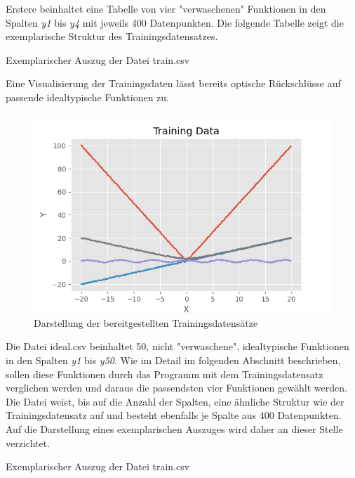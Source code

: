 Erstere beinhaltet eine Tabelle von vier "verwaschenen" Funktionen in den Spalten \emph{y1} bis \emph{y4} mit jeweils 400 Datenpunkten. Die folgende Tabelle zeigt die exemplarische Struktur des Trainingsdatensatzes.

\begin{table}[H]
\small
\centering
{}
\caption{Exemplarischer Auszug der Datei train.csv}
\label{tab:train.csv}
\end{table} 


Eine Visualisierung der Trainingsdaten lässt bereits optische Rückschlüsse auf passende idealtypische Funktionen zu.
\begin{figure}[h]
\centering
\includegraphics[width=13cm]{../output/figures/train.png}
\caption{Darstellung der bereitgestellten Trainingsdatensätze \cite{Gage:18}}\label{fig:train}
\end{figure}

Die Datei ideal.csv beinhaltet 50, nicht "verwaschene", idealtypische Funktionen in den Spalten \emph{y1} bis \emph{y50}. Wie im Detail im folgenden Abschnitt beschrieben, sollen diese Funktionen durch das Programm mit dem Trainingsdatensatz verglichen werden und daraus die passendsten vier Funktionen gewählt werden. Die Datei weist, bis auf die Anzahl der Spalten, eine ähnliche Struktur wie der Trainingsdatensatz auf und besteht ebenfalls je Spalte aus 400 Datenpunkten. Auf die Darstellung eines exemplarischen Auszuges wird daher an dieser Stelle verzichtet.

\begin{table}[H]
\small
\centering
{}
\caption{Exemplarischer Auszug der Datei train.csv}
\label{tab:ideal.csv}
\end{table} 

